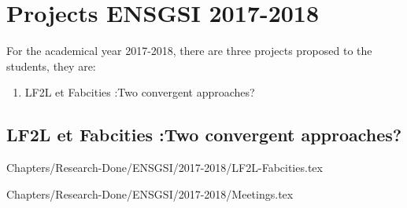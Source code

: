 \chapter{ Projects  ENSGSI 2017-2018}


For the academical year 2017-2018, there are three projects proposed to the students, they are:

\begin{enumerate}
	\item LF2L et Fabcities :Two convergent approaches?  
\end{enumerate}


\section{LF2L et Fabcities :Two convergent approaches? }

{Chapters/Research-Done/ENSGSI/2017-2018/LF2L-Fabcities.tex} 


{Chapters/Research-Done/ENSGSI/2017-2018/Meetings.tex} 